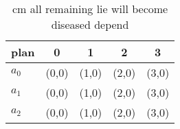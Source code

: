 \documentclass[a4paper]{article}
\begin{document}
\begin{table}
\begin{adjustbox}{width=0.6\columnwidth}
\begin{tabular}{|l|l|l|l|l|}
\hline
\textbf{plan} & \multicolumn{1}{c|}{\textbf{0}} & \multicolumn{1}{c|}{\textbf{1}} & \multicolumn{1}{c|}{\textbf{2}} & \multicolumn{1}{c|}{\textbf{3}} \\ \hline
\textbf{$a_0$}  & (0,0) & (1,0) & (2,0) & (3,0) \\ \hline
\textbf{$a_1$}  & (0,0) & (1,0) & (2,0) & (3,0) \\ \hline
\textbf{$a_2$}  & (0,0) & (1,0) & (2,0) & (3,0) \\ \hline
\end{tabular}
\end{adjustbox}
\caption{ cm all remaining lie will become diseased depend
}
\end{table}
\end{document}
